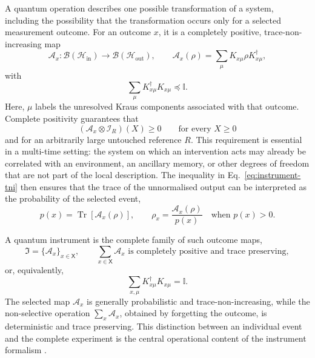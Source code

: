 A quantum operation describes one possible transformation of a system, including the possibility that the transformation occurs only for a selected measurement outcome.
For an outcome \(x\), it is a completely positive, trace-non-increasing map
%
\begin{equation}
    \mathcal A_x : \mathcal B(\mathcal H_{\mathrm{in}}) \longrightarrow \mathcal B(\mathcal H_{\mathrm{out}}), \qquad \mathcal A_x(\rho)
    = \sum_{\mu} K_{x\mu}\rho K_{x\mu}^{\dagger},
    \label{eq:instrument-operation-kraus}
\end{equation}
%
with
%
\begin{equation}
    \sum_{\mu} K_{x\mu}^{\dagger} K_{x\mu}\preceq \mathbb I.
    \label{eq:instrument-tni}
\end{equation}
%
Here, \(\mu\) labels the unresolved Kraus components associated with that outcome.
Complete positivity guarantees that
%
\begin{equation}
    (\mathcal A_x\otimes\mathcal I_R)(X)\geq0 \qquad\text{for every }X\geq0
    \label{eq:instrument-cp}
\end{equation}
%
and for an arbitrarily large untouched reference \(R\).
This requirement is essential in a multi-time setting: the system on which an intervention acts may already be correlated with an environment, an ancillary memory, or other degrees of freedom that are not part of the local description.
The inequality in Eq.~\eqref{eq:instrument-tni} then ensures that the trace of the unnormalised output can be interpreted as the probability of the selected event,
%
\begin{equation}
    p(x)=\operatorname{Tr}[\mathcal A_x(\rho)], \qquad \rho_x=\frac{\mathcal A_x(\rho)}{p(x)} \quad\text{when }p(x)>0.
    \label{eq:instrument-outcome-state}
\end{equation}
%

A quantum instrument is the complete family of such outcome maps,
%
\begin{equation}
    \mathfrak I=\{\mathcal A_x\}_{x\in\mathsf X},
    \qquad
    \sum_{x\in\mathsf X}\mathcal A_x
    \text{ is completely positive and trace preserving},
    \label{eq:quantum-instrument-family}
\end{equation}
%
or, equivalently,
%
\begin{equation}
    \sum_{x,\mu} K_{x\mu}^{\dagger} K_{x\mu}=\mathbb I.
    \label{eq:instrument-normalisation}
\end{equation}
%
The selected map \(\mathcal A_x\) is generally probabilistic and trace-non-increasing, while the non-selective operation \(\sum_x\mathcal A_x\), obtained by forgetting the outcome, is deterministic and trace preserving.
This distinction between an individual event and the complete experiment is the central operational content of the instrument formalism \cite{DaviesLewis1970,Ozawa1984}.

